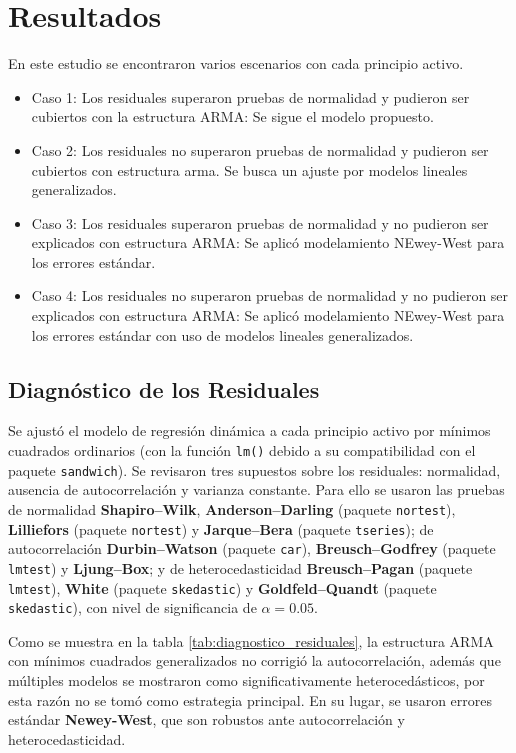 \documentclass[10pt,twoside,xcolor=table,x11anmes]{IEEEtran}
\begin{document}
\section[Resultados]{Resultados}

En este estudio se encontraron varios escenarios con cada principio activo.

\begin{itemize}
    \item Caso 1: Los residuales superaron pruebas de normalidad y pudieron ser cubiertos con la estructura ARMA: Se sigue el modelo propuesto. 
    \item Caso 2: Los residuales no superaron pruebas de normalidad y pudieron ser cubiertos con estructura arma. Se busca un ajuste por modelos lineales generalizados. 
    \item Caso 3: Los residuales superaron pruebas de normalidad y no pudieron ser explicados con estructura ARMA: Se aplicó modelamiento NEwey-West para los errores estándar.
    \item Caso 4: Los residuales no superaron pruebas de normalidad y no pudieron ser explicados con estructura ARMA: Se aplicó modelamiento NEwey-West para los errores estándar con uso de modelos lineales generalizados.
\end{itemize}

\subsection{Diagnóstico de los Residuales}
Se ajustó el modelo de regresión dinámica a cada principio activo por mínimos cuadrados ordinarios (con la función \texttt{lm()} debido a su compatibilidad con el paquete \texttt{sandwich}). Se revisaron tres supuestos sobre los residuales: normalidad, ausencia de autocorrelación y varianza constante. Para ello se usaron las pruebas de normalidad \textbf{Shapiro--Wilk}, \textbf{Anderson--Darling} (paquete \texttt{nortest}), \textbf{Lilliefors} (paquete \texttt{nortest}) y \textbf{Jarque--Bera} (paquete \texttt{tseries}); de autocorrelación \textbf{Durbin--Watson} (paquete \texttt{car}), \textbf{Breusch--Godfrey} (paquete \texttt{lmtest}) y \textbf{Ljung--Box}; y de heterocedasticidad \textbf{Breusch--Pagan} (paquete \texttt{lmtest}), \textbf{White} (paquete \texttt{skedastic}) y \textbf{Goldfeld--Quandt} (paquete \texttt{skedastic}), con nivel de significancia de $\alpha=0.05$.

Como se muestra en la tabla \ref{tab:diagnostico_residuales}, la estructura ARMA con mínimos cuadrados generalizados no corrigió la autocorrelación, además que múltiples modelos se mostraron como significativamente heterocedásticos, por esta razón no se tomó como estrategia principal. En su lugar, se usaron errores estándar \textbf{Newey-West}, que son robustos ante autocorrelación y heterocedasticidad.
\end{document}
